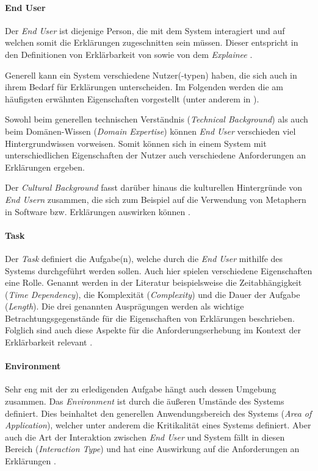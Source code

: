 \paragraph{End User} Der \textit{End User} ist diejenige Person, die mit dem System interagiert und auf welchen somit die Erklärungen zugeschnitten sein müssen. Dieser entspricht in den Definitionen von Erklärbarkeit von \citeauthor{chazette_knowledge_nodate} sowie von \citeauthor{kohl_explainability_2019} dem \textit{Explainee} \cite{chazette_knowledge_nodate, kohl_explainability_2019}.

Generell kann ein System verschiedene Nutzer(-typen) haben, die sich auch in ihrem Bedarf für Erklärungen unterscheiden. Im Folgenden werden die am häufigsten erwähnten Eigenschaften vorgestellt (unter anderem in \cite{chazette_knowledge_nodate,tintarev_designing_nodate,yamada_evaluating_2016}).

Sowohl beim generellen technischen Verständnis (\textit{Technical Background}) als auch beim Domänen-Wissen (\textit{Domain Expertise}) \cite{yamada_evaluating_2016} können \textit{End User} verschieden viel Hintergrundwissen vorweisen. Somit können sich in einem System mit unterschiedlichen Eigenschaften der  Nutzer auch verschiedene Anforderungen an Erklärungen ergeben.

Der \textit{Cultural Background} fasst darüber hinaus die kulturellen Hintergründe von \textit{End Usern} zusammen, die sich zum Beispiel auf die Verwendung von Metaphern in Software bzw. Erklärungen auswirken können \cite{salgado_cultural_2015}.

\paragraph{Task} Der \textit{Task} definiert die Aufgabe(n), welche durch die \textit{End User} mithilfe des Systems durchgeführt werden sollen. Auch hier spielen verschiedene Eigenschaften eine Rolle. Genannt werden in der Literatur beispielsweise die Zeitabhängigkeit (\textit{Time Dependency}), die Komplexität (\textit{Complexity}) und die Dauer der Aufgabe (\textit{Length}). Die drei genannten Ausprägungen werden als wichtige Betrachtungsgegenstände für die Eigenschaften von Erklärungen beschrieben. Folglich sind auch diese Aspekte für die Anforderungserhebung im Kontext der Erklärbarkeit relevant \cite{sokol_explainability_2020}.

\paragraph{Environment} Sehr eng mit der zu erledigenden Aufgabe hängt auch dessen Umgebung zusammen. Das \textit{Environment} ist durch die äußeren Umstände des Systems definiert. Dies beinhaltet den generellen Anwendungsbereich des Systems (\textit{Area of Application}), welcher unter anderem die Kri­ti­ka­li­tät eines Systems definiert. Aber auch die Art der Interaktion zwischen \textit{End User} und System fällt in diesen Bereich (\textit{Interaction Type}) und hat eine Auswirkung auf die Anforderungen an Erklärungen \cite{wiegand_id_2020}. 

